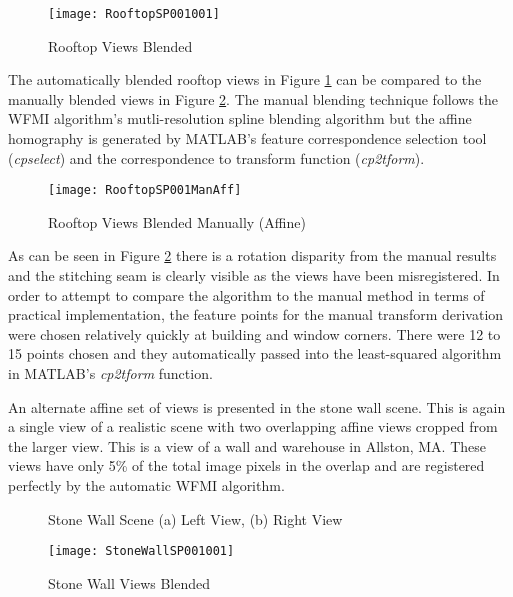 \begin{figure}[!h]
\centering
\texttt{[image: RooftopSP001001]}
\caption{Rooftop Views Blended}
\label{RooftopStitched}
\end{figure}

The automatically blended rooftop views in Figure \ref{RooftopStitched} can be compared to the manually blended views in Figure \ref{RooftopStitchedManual}. The manual blending technique follows the WFMI algorithm's mutli-resolution spline blending algorithm but the affine homography is generated by MATLAB\textsuperscript{\textregistered}'s feature correspondence selection tool (\textit{cpselect}) and the correspondence to transform function (\textit{cp2tform}).

\begin{figure}[!h]
\centering
\texttt{[image: RooftopSP001ManAff]}
\caption{Rooftop Views Blended Manually (Affine)}
\label{RooftopStitchedManual}
\end{figure}

As can be seen in Figure \ref{RooftopStitchedManual} there is a rotation disparity from the manual results and the stitching seam is clearly visible as the views have been misregistered. In order to attempt to compare the algorithm to the manual method in terms of practical implementation, the feature points for the manual transform derivation were chosen relatively quickly at building and window corners. There were 12 to 15 points chosen and they automatically passed into the least-squared algorithm in MATLAB\textsuperscript{\textregistered}'s \textit{cp2tform} function.

An alternate affine set of views is presented in the stone wall scene. This is again a single view of a realistic scene with two overlapping affine views cropped from the larger view. This is a view of a wall and warehouse in Allston, MA. These views have only 5\% of the total image pixels in the overlap and are registered perfectly by the automatic WFMI algorithm.

\begin{figure}[!h]
\label{StoneWallImages}
\centering
{}
\caption{Stone Wall Scene (a) Left View, (b) Right View}
\end{figure}

\begin{figure}[!h]
\label{StoneWallStitched}
\centering
\texttt{[image: StoneWallSP001001]}
\caption{Stone Wall Views Blended}
\end{figure}



